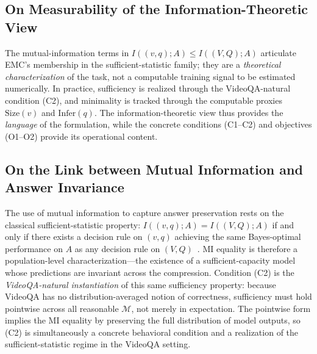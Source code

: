 \subsection{On Measurability of the Information-Theoretic View}
\label{appendix:measurability}

The mutual-information terms in $I((v,q); A) \leq I((V,Q); A)$ articulate EMC's membership in the sufficient-statistic family; they are a \textit{theoretical characterization} of the task, not a computable training signal to be estimated numerically. In practice, sufficiency is realized through the VideoQA-natural condition (C2), and minimality is tracked through the computable proxies $\mathrm{Size}(v)$ and $\mathrm{Infer}(q)$. The information-theoretic view thus provides the \textit{language} of the formulation, while the concrete conditions (C1--C2) and objectives (O1--O2) provide its operational content.

\subsection{On the Link between Mutual Information and Answer Invariance}
\label{appendix:mi_answer_link}

The use of mutual information to capture answer preservation rests on the classical sufficient-statistic property: $I((v, q); A) = I((V, Q); A)$ if and only if there exists a decision rule on $(v, q)$ achieving the same Bayes-optimal performance on $A$ as any decision rule on $(V, Q)$~\citep[Ch.~2.9]{cover2006elements}. MI equality is therefore a population-level characterization---the existence of a sufficient-capacity model whose predictions are invariant across the compression. Condition (C2) is the \textit{VideoQA-natural instantiation} of this same sufficiency property: because VideoQA has no distribution-averaged notion of correctness, sufficiency must hold pointwise across all reasonable $\mathcal{M}$, not merely in expectation. The pointwise form implies the MI equality by preserving the full distribution of model outputs, so (C2) is simultaneously a concrete behavioral condition and a realization of the sufficient-statistic regime in the VideoQA setting.
